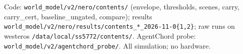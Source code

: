 \documentclass[11pt,a4paper]{article}
\begin{document}
\vfill
\footnotesize\sloppy\noindent Code: \texttt{world\_model/v2/nero/contents/} (envelope, thresholds, scenes, carry, carry\_cert,
baseline\_ungated, compare); results \texttt{world\_model/v2/nero/results/contents\_*\_2026-11-0\{1,2\}}; raw runs on westeros
\texttt{/data/local/ss5772/contents/}. AgentChord probe: \texttt{world\_model/v2/agentchord\_probe/}. All simulation; no hardware.
\end{document}
